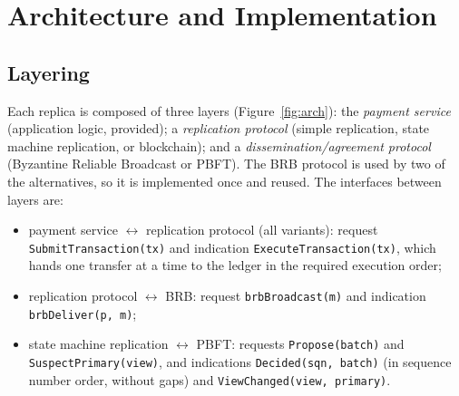 \documentclass[sigconf,a4paper]{acmart}
\newcommand{\api}[1]{\texttt{#1}}
\begin{document}
    \section{Architecture and Implementation}
    \label{sec:impl}

    \subsection{Layering}

    Each replica is composed of three layers (Figure~\ref{fig:arch}): the
    \emph{payment service} (application logic, provided); a \emph{replication
    protocol} (simple replication, state machine replication, or blockchain); and
    a \emph{dissemination/agreement protocol} (Byzantine Reliable Broadcast or
    PBFT). The BRB protocol is used by two of the alternatives, so it is
    implemented once and reused. The interfaces between layers are:
    \begin{itemize}
        \item payment service $\leftrightarrow$ replication protocol (all variants):
        request \api{SubmitTransaction}\allowbreak\api{(tx)} and indication
        \api{ExecuteTransaction}\allowbreak\api{(tx)}, which hands one transfer
        at a time to the ledger in the required execution order;
        \item replication protocol $\leftrightarrow$ BRB: request
        \api{brbBroadcast(m)} and indication \api{brbDeliver(p, m)};
        \item state machine replication $\leftrightarrow$ PBFT: requests
        \api{Propose}\allowbreak\api{(batch)} and
        \api{SuspectPrimary}\allowbreak\api{(view)}, and indications
        \api{Decided}\allowbreak\api{(sqn, batch)} (in sequence number order,
        without gaps) and \api{ViewChanged}\allowbreak\api{(view, primary)}.
    \end{itemize}
\end{document}
